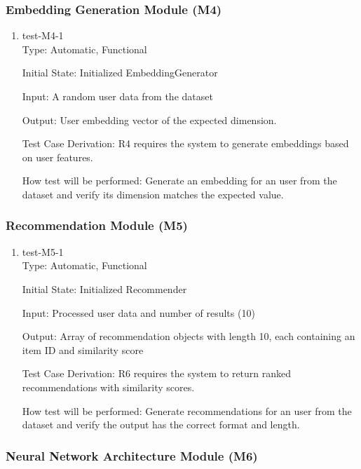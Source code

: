 \documentclass[12pt, titlepage]{article}
\begin{document}
\subsubsection{Embedding Generation Module (M4)}
\begin{enumerate}

  \item{test-M4-1\\}
  Type: Automatic, Functional
            
  Initial State: Initialized EmbeddingGenerator
            
  Input: A random user data from the dataset
            
  Output: User embedding vector of the expected dimension.
  
  Test Case Derivation: R4 requires the system to generate embeddings based on user features.
  
  How test will be performed: Generate an embedding for an user from the dataset and verify its dimension matches the expected value.
  
  \end{enumerate}

\subsubsection{Recommendation Module (M5)}

\begin{enumerate}

\item{test-M5-1\\}
Type: Automatic, Functional
					
Initial State: Initialized Recommender
					
Input: Processed user data and number of results (10)
					
Output: Array of recommendation objects with length 10, each containing an item ID and similarity score

Test Case Derivation: R6 requires the system to return ranked recommendations with similarity scores.

How test will be performed: Generate recommendations for an user from the dataset and verify the output has the correct format and length.

\end{enumerate}

\subsubsection{Neural Network Architecture Module (M6)}
\end{document}
